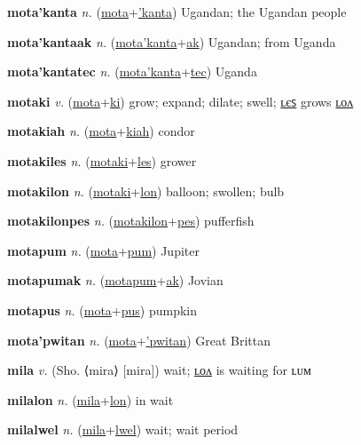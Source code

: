 \textbf{\hypertarget{mota'kanta}{mota'kanta}} \textit{n.} (\hyperlink{mota}{mota}+\allowbreak \hyperlink{'kanta}{'kanta})
Ugandan; the Ugandan people

\textbf{\hypertarget{mota'kantaak}{mota'kantaak}} \textit{n.} (\hyperlink{mota'kanta}{mota'kanta}+\allowbreak \hyperlink{ak}{ak})
Ugandan; from Uganda

\textbf{\hypertarget{mota'kantatec}{mota'kantatec}} \textit{n.} (\hyperlink{mota'kanta}{mota'kanta}+\allowbreak \hyperlink{tec}{tec})
Uganda

\textbf{\hypertarget{motaki}{motaki}} \textit{v.} (\hyperlink{mota}{mota}+\allowbreak \hyperlink{ki}{ki})
grow; expand; dilate; swell; \hyperlink{motakiles}{ʟєꜱ} grows \hyperlink{motakilon}{ʟᴏᴧ}

\textbf{\hypertarget{motakiah}{motakiah}} \textit{n.} (\hyperlink{mota}{mota}+\allowbreak \hyperlink{kiah}{kiah})
condor

\textbf{\hypertarget{motakiles}{motakiles}} \textit{n.} (\hyperlink{motaki}{motaki}+\allowbreak \hyperlink{les}{les})
grower

\textbf{\hypertarget{motakilon}{motakilon}} \textit{n.} (\hyperlink{motaki}{motaki}+\allowbreak \hyperlink{lon}{lon})
balloon; swollen; bulb

\textbf{\hypertarget{motakilonpes}{motakilonpes}} \textit{n.} (\hyperlink{motakilon}{motakilon}+\allowbreak \hyperlink{pes}{pes})
pufferfish

\textbf{\hypertarget{motapum}{motapum}} \textit{n.} (\hyperlink{mota}{mota}+\allowbreak \hyperlink{pum}{pum})
Jupiter

\textbf{\hypertarget{motapumak}{motapumak}} \textit{n.} (\hyperlink{motapum}{motapum}+\allowbreak \hyperlink{ak}{ak})
Jovian

\textbf{\hypertarget{motapus}{motapus}} \textit{n.} (\hyperlink{mota}{mota}+\allowbreak \hyperlink{pus}{pus})
pumpkin

\textbf{\hypertarget{mota'pwitan}{mota'pwitan}} \textit{n.} (\hyperlink{mota}{mota}+\allowbreak \hyperlink{'pwitan}{'pwitan})
Great Brittan

\textbf{\hypertarget{mila}{mila}} \textit{v.} (Sho. ⟨mira⟩ [mira])
wait; \hyperlink{milalon}{ʟᴏᴧ} is waiting for ʟᴜᴍ

\textbf{\hypertarget{milalon}{milalon}} \textit{n.} (\hyperlink{mila}{mila}+\allowbreak \hyperlink{lon}{lon})
in wait

\textbf{\hypertarget{milalwel}{milalwel}} \textit{n.} (\hyperlink{mila}{mila}+\allowbreak \hyperlink{lwel}{lwel})
wait; wait period


